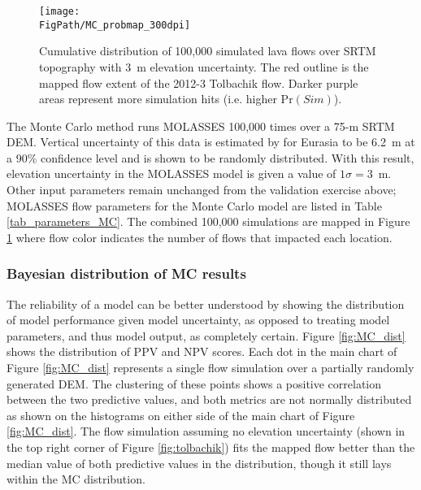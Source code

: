 		\begin{figure}
			\centering
			\texttt{[image: \\FigPath/MC\_probmap\_300dpi]}
			\caption[Cumulative distribution of 100,000 simulated lava flows over SRTM topography with 3~m elevation uncertainty]{Cumulative distribution of 100,000 simulated lava flows over SRTM topography with 3~m elevation uncertainty. The red outline is the mapped flow extent of the 2012-3 Tolbachik flow. Darker purple areas represent more simulation hits (i.e. higher $\text{Pr}(Sim)$).}
			\label{fig_MC_map}
		\end{figure}
		
		The Monte Carlo method runs MOLASSES 100,000 times over a 75-m SRTM DEM. Vertical uncertainty of this data is estimated by \citet{rodriguez2006global} for Eurasia to be 6.2~m at a 90\% confidence level and is shown to be randomly distributed. With this result, elevation uncertainty in the MOLASSES model is given a value of $1\sigma=3$~m. Other input parameters remain unchanged from the validation exercise above; MOLASSES flow parameters for the Monte Carlo model are listed in Table \ref{tab_parameters_MC}. The combined 100,000 simulations are mapped in Figure \ref{fig_MC_map} where flow color indicates the number of flows that impacted each location.
		

				
		\subsubsection{Bayesian distribution of MC results}
			The reliability of a model can be better understood by showing the distribution of model performance given model uncertainty, as opposed to treating model parameters, and thus model output, as completely certain.  Figure \ref{fig:MC_dist} shows the distribution of PPV and NPV scores. Each dot in the main chart of Figure \ref{fig:MC_dist} represents a single flow simulation over a partially randomly generated DEM. The clustering of these points shows a positive correlation between the two predictive values, and both metrics are not normally distributed as shown on the histograms on either side of the main chart of Figure \ref{fig:MC_dist}. The flow simulation assuming no elevation uncertainty (shown in the top right corner of Figure \ref{fig:tolbachik}) fits the mapped flow better than the median value of both predictive values in the distribution, though it still lays within the MC distribution.
			

